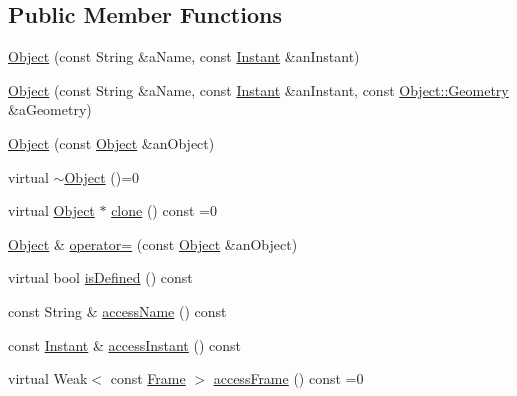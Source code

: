 \subsection*{Public Member Functions}
\begin{DoxyCompactItemize}
\item 
\hyperlink{classlibrary_1_1physics_1_1env_1_1_object_af112257aa51a94dcc61a36e2c0db4b05}{Object} (const String \&a\+Name, const \hyperlink{classlibrary_1_1physics_1_1time_1_1_instant}{Instant} \&an\+Instant)
\item 
\hyperlink{classlibrary_1_1physics_1_1env_1_1_object_a37e5ddc8f0b89e006025a7ac6ac71fe5}{Object} (const String \&a\+Name, const \hyperlink{classlibrary_1_1physics_1_1time_1_1_instant}{Instant} \&an\+Instant, const \hyperlink{classlibrary_1_1physics_1_1env_1_1_object_a750fd821b17667fec9e0a4eda23af048}{Object\+::\+Geometry} \&a\+Geometry)
\item 
\hyperlink{classlibrary_1_1physics_1_1env_1_1_object_ac7b0b65eb0f2a65a46314269687ad49e}{Object} (const \hyperlink{classlibrary_1_1physics_1_1env_1_1_object}{Object} \&an\+Object)
\item 
virtual \hyperlink{classlibrary_1_1physics_1_1env_1_1_object_a2b48d75c2f1a01e2808e9efe4fe68393}{$\sim$\+Object} ()=0
\item 
virtual \hyperlink{classlibrary_1_1physics_1_1env_1_1_object}{Object} $\ast$ \hyperlink{classlibrary_1_1physics_1_1env_1_1_object_a498e0d1a15e937a5aa77374c6f899768}{clone} () const =0
\item 
\hyperlink{classlibrary_1_1physics_1_1env_1_1_object}{Object} \& \hyperlink{classlibrary_1_1physics_1_1env_1_1_object_a1e7d9e24f984bcc13e89625805ae15aa}{operator=} (const \hyperlink{classlibrary_1_1physics_1_1env_1_1_object}{Object} \&an\+Object)
\item 
virtual bool \hyperlink{classlibrary_1_1physics_1_1env_1_1_object_a7035edc921681401ddd43b094645a024}{is\+Defined} () const
\item 
const String \& \hyperlink{classlibrary_1_1physics_1_1env_1_1_object_a0cf28bef038e493ee0771680976f5e28}{access\+Name} () const
\item 
const \hyperlink{classlibrary_1_1physics_1_1time_1_1_instant}{Instant} \& \hyperlink{classlibrary_1_1physics_1_1env_1_1_object_a3f183331fd0ad20e88cae41e2491a5dc}{access\+Instant} () const
\item 
virtual Weak$<$ const \hyperlink{classlibrary_1_1physics_1_1coord_1_1_frame}{Frame} $>$ \hyperlink{classlibrary_1_1physics_1_1env_1_1_object_a304d1fc452fbe6a45ef5f55591a0787a}{access\+Frame} () const =0

\end{DoxyCompactItemize}
